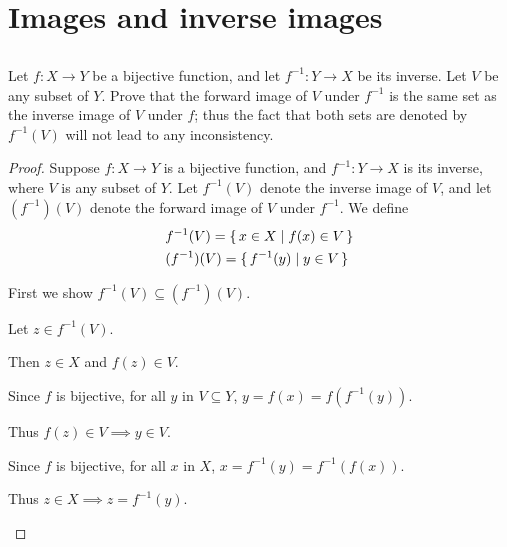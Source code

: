 \documentclass[../../main.tex]{subfiles}
\begin{document}
\ifmainfile
\else
    \ifchapfile
    \else
        \addtocounter{chapter}{3}
        \addtocounter{section}{3}
        \makeatletter
        \begin{flushright}
            \@title \\
            \@author \\
            \@date
        \end{flushright}
    \fi
\fi

\section{Images and inverse images}
\subsection{}
\begin{q}
    Let $f \colon X \to Y$ be a bijective function, and let $f^{-1} \colon Y \to X$ be its inverse. Let $V$ be any subset of $Y$. Prove that the forward image of $V$ under $f^{-1}$ is the same set as the inverse image of $V$ under $f$; thus the fact that both sets are denoted by $f^{-1}(V)$ will not lead to any inconsistency.
\end{q}
    
\begin{proof}
    Suppose $f \colon X \to Y$ is a bijective function, and $f^{-1} \colon Y \to X$ is its inverse, where $V$ is any subset of $Y$.
    Let $f^{-1}(V)$ denote the inverse image of $V$, and let $(f^{-1})(V)$ denote the forward image of $V$ under $f^{-1}$.
    We define
    \begin{equation*}
    \begin{aligned}
        & f^{-1}(V) = \{\,x \in X\mid f(x) \in V\,\} \\
        & (f^{-1})(V) = \{\,f^{-1}(y)\mid y \in V\,\}
    \end{aligned}
    \end{equation*}

    \begin{lxl}
            \item First we show $f^{-1}(V) \subseteq (f^{-1})(V)$.
            \item Let $z \in f^{-1}(V)$. 
            \item Then $z \in X$ and $f(z) \in V$. 
            \item Since $f$ is bijective, for all $y$ in $V \subseteq Y$, $y = f(x) = f(f^{-1}(y))$.
            \item Thus $f(z) \in V \implies y \in V$. 
            \item Since $f$ is bijective, for all $x$ in $X$, $x = f^{-1}(y) = f^{-1}(f(x))$.
            \item Thus $z \in X \implies z = f^{-1}(y)$. 
    \end{lxl}
\end{proof}
\end{document}

